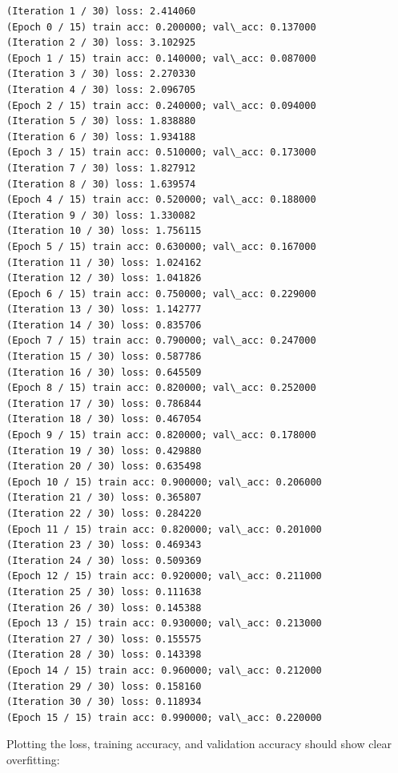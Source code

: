 \documentclass[11pt]{article}
\begin{document}
    \begin{Verbatim}[commandchars=\\\{\}]
(Iteration 1 / 30) loss: 2.414060
(Epoch 0 / 15) train acc: 0.200000; val\_acc: 0.137000
(Iteration 2 / 30) loss: 3.102925
(Epoch 1 / 15) train acc: 0.140000; val\_acc: 0.087000
(Iteration 3 / 30) loss: 2.270330
(Iteration 4 / 30) loss: 2.096705
(Epoch 2 / 15) train acc: 0.240000; val\_acc: 0.094000
(Iteration 5 / 30) loss: 1.838880
(Iteration 6 / 30) loss: 1.934188
(Epoch 3 / 15) train acc: 0.510000; val\_acc: 0.173000
(Iteration 7 / 30) loss: 1.827912
(Iteration 8 / 30) loss: 1.639574
(Epoch 4 / 15) train acc: 0.520000; val\_acc: 0.188000
(Iteration 9 / 30) loss: 1.330082
(Iteration 10 / 30) loss: 1.756115
(Epoch 5 / 15) train acc: 0.630000; val\_acc: 0.167000
(Iteration 11 / 30) loss: 1.024162
(Iteration 12 / 30) loss: 1.041826
(Epoch 6 / 15) train acc: 0.750000; val\_acc: 0.229000
(Iteration 13 / 30) loss: 1.142777
(Iteration 14 / 30) loss: 0.835706
(Epoch 7 / 15) train acc: 0.790000; val\_acc: 0.247000
(Iteration 15 / 30) loss: 0.587786
(Iteration 16 / 30) loss: 0.645509
(Epoch 8 / 15) train acc: 0.820000; val\_acc: 0.252000
(Iteration 17 / 30) loss: 0.786844
(Iteration 18 / 30) loss: 0.467054
(Epoch 9 / 15) train acc: 0.820000; val\_acc: 0.178000
(Iteration 19 / 30) loss: 0.429880
(Iteration 20 / 30) loss: 0.635498
(Epoch 10 / 15) train acc: 0.900000; val\_acc: 0.206000
(Iteration 21 / 30) loss: 0.365807
(Iteration 22 / 30) loss: 0.284220
(Epoch 11 / 15) train acc: 0.820000; val\_acc: 0.201000
(Iteration 23 / 30) loss: 0.469343
(Iteration 24 / 30) loss: 0.509369
(Epoch 12 / 15) train acc: 0.920000; val\_acc: 0.211000
(Iteration 25 / 30) loss: 0.111638
(Iteration 26 / 30) loss: 0.145388
(Epoch 13 / 15) train acc: 0.930000; val\_acc: 0.213000
(Iteration 27 / 30) loss: 0.155575
(Iteration 28 / 30) loss: 0.143398
(Epoch 14 / 15) train acc: 0.960000; val\_acc: 0.212000
(Iteration 29 / 30) loss: 0.158160
(Iteration 30 / 30) loss: 0.118934
(Epoch 15 / 15) train acc: 0.990000; val\_acc: 0.220000

    \end{Verbatim}

    Plotting the loss, training accuracy, and validation accuracy should
show clear overfitting:
\end{document}
